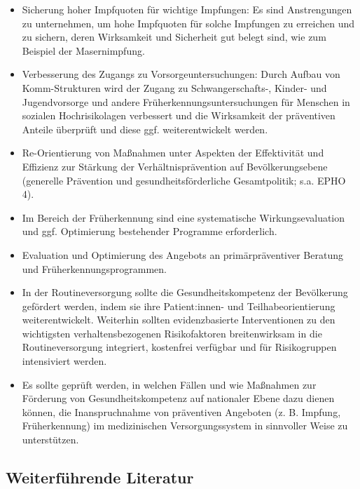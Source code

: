 \documentclass{article}
\begin{document}
\begin{itemize}
\item Sicherung hoher Impfquoten für wichtige Impfungen: Es sind Anstrengungen zu unternehmen, um hohe Impfquoten für solche Impfungen zu erreichen und zu sichern, deren Wirksamkeit und Sicherheit gut belegt sind, wie zum Beispiel der Masernimpfung.


\item Verbesserung des Zugangs zu Vorsorgeuntersuchungen: Durch Aufbau von Komm-Strukturen wird der Zugang zu Schwangerschafts-, Kinder- und Jugendvorsorge und andere Früherkennungsuntersuchungen für Menschen in sozialen Hochrisikolagen verbessert und die Wirksamkeit der präventiven Anteile überprüft und diese ggf. weiterentwickelt werden.


\item Re-Orientierung von Maßnahmen unter Aspekten der Effektivität und Effizienz zur Stärkung der Verhältnisprävention auf Bevölkerungsebene (generelle Prävention und gesundheitsförderliche Gesamtpolitik; s.a. EPHO 4).


\item Im Bereich der Früherkennung sind eine systematische Wirkungsevaluation und ggf. Optimierung bestehender Programme erforderlich.


\item Evaluation und Optimierung des Angebots an primärpräventiver Beratung und Früherkennungsprogrammen.


\item In der Routineversorgung sollte die Gesundheitskompetenz der Bevölkerung gefördert werden, indem sie ihre Patient:innen- und Teilhabeorientierung weiterentwickelt. Weiterhin sollten evidenzbasierte Interventionen zu den wichtigsten verhaltensbezogenen Risikofaktoren breitenwirksam in die Routineversorgung integriert, kostenfrei verfügbar und für Risikogruppen intensiviert werden.


\item Es sollte geprüft werden, in welchen Fällen und wie Maßnahmen zur Förderung von Gesundheitskompetenz auf nationaler Ebene dazu dienen können, die Inanspruchnahme von präventiven Angeboten (z. B. Impfung, Früherkennung) im medizinischen Versorgungssystem in sinnvoller Weise zu unterstützen.


\end{itemize}

\subsection{Weiterführende Literatur}\label{H2442733}
\end{document}

